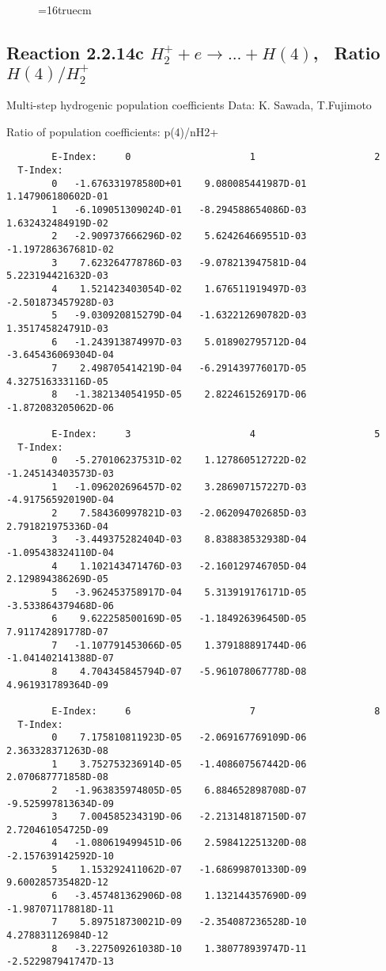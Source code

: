 \documentclass[12pt,dvipdfmx]{article}
\begin{document}
\begin{figure} \label{2.2.14b}
\epsfxsize=16truecm
\end{figure}
\newpage

\subsection{
Reaction 2.2.14c $ H_2^+ + e \rightarrow ...+ H(4) $, \   Ratio $H(4)/H_2^+  $
}

 Multi-step hydrogenic population coefficients
 Data: K. Sawada, T.Fujimoto \cite{kn:Sawada}

 Ratio of population coefficients: p(4)/nH2+


\begin{small}\begin{verbatim}
        E-Index:     0                     1                     2
  T-Index:
        0   -1.676331978580D+01    9.080085441987D-01    1.147906180602D-01
        1   -6.109051309024D-01   -8.294588654086D-03    1.632432484919D-02
        2   -2.909737666296D-02    5.624264669551D-03   -1.197286367681D-02
        3    7.623264778786D-03   -9.078213947581D-04    5.223194421632D-03
        4    1.521423403054D-02    1.676511919497D-03   -2.501873457928D-03
        5   -9.030920815279D-04   -1.632212690782D-03    1.351745824791D-03
        6   -1.243913874997D-03    5.018902795712D-04   -3.645436069304D-04
        7    2.498705414219D-04   -6.291439776017D-05    4.327516333116D-05
        8   -1.382134054195D-05    2.822461526917D-06   -1.872083205062D-06

        E-Index:     3                     4                     5
  T-Index:
        0   -5.270106237531D-02    1.127860512722D-02   -1.245143403573D-03
        1   -1.096202696457D-02    3.286907157227D-03   -4.917565920190D-04
        2    7.584360997821D-03   -2.062094702685D-03    2.791821975336D-04
        3   -3.449375282404D-03    8.838838532938D-04   -1.095438324110D-04
        4    1.102143471476D-03   -2.160129746705D-04    2.129894386269D-05
        5   -3.962453758917D-04    5.313919176171D-05   -3.533864379468D-06
        6    9.622258500169D-05   -1.184926396450D-05    7.911742891778D-07
        7   -1.107791453066D-05    1.379188891744D-06   -1.041402141388D-07
        8    4.704345845794D-07   -5.961078067778D-08    4.961931789364D-09

        E-Index:     6                     7                     8
  T-Index:
        0    7.175810811923D-05   -2.069167769109D-06    2.363328371263D-08
        1    3.752753236914D-05   -1.408607567442D-06    2.070687771858D-08
        2   -1.963835974805D-05    6.884652898708D-07   -9.525997813634D-09
        3    7.004585234319D-06   -2.213148187150D-07    2.720461054725D-09
        4   -1.080619499451D-06    2.598412251320D-08   -2.157639142592D-10
        5    1.153292411062D-07   -1.686998701330D-09    9.600285735482D-12
        6   -3.457481362906D-08    1.132144357690D-09   -1.987071178818D-11
        7    5.897518730021D-09   -2.354087236528D-10    4.278831126984D-12
        8   -3.227509261038D-10    1.380778939747D-11   -2.522987941747D-13


\end{verbatim}
\end{small}
\end{document}

